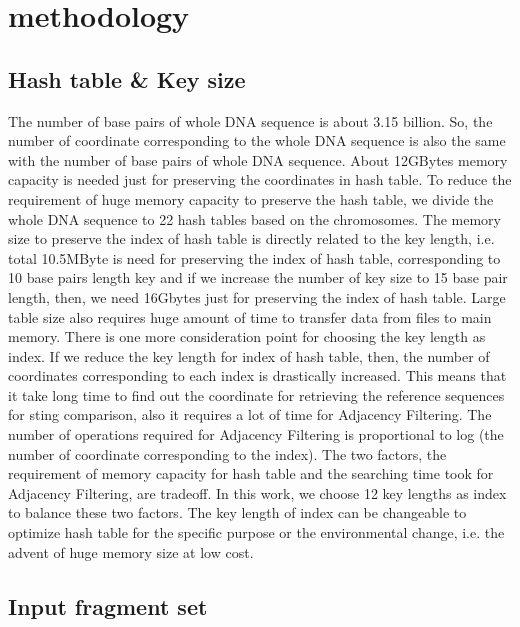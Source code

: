 \section{methodology} \label{sec:methodology}

\subsection{Hash table \& Key size} \label{sec:method_hash} 

The number of base pairs of whole DNA sequence is about 3.15 billion. So, the
number of coordinate corresponding to the whole DNA sequence is also the same
with the number of base pairs of whole DNA sequence. About 12GBytes memory
capacity is needed just for preserving the coordinates in hash table. To reduce
the requirement of huge memory capacity to preserve the hash table, we divide
the whole DNA sequence to 22 hash tables based on the chromosomes. The memory
size to preserve the index of hash table is directly related to the key length,
i.e. total 10.5MByte is need for preserving the index of hash table,
corresponding to 10 base pairs length key and if we increase the number of key
size to 15 base pair length, then, we need 16Gbytes just for preserving the
index of hash table. Large table size also requires huge amount of time to
transfer data from files to main memory. There is one more consideration point
for choosing the key length as index. If we reduce the key length for index of
hash table, then, the number of coordinates corresponding to each index is
drastically increased. This means that it take long time to find out the
coordinate for retrieving the reference sequences for sting comparison, also it
requires a lot of time for Adjacency Filtering. The number of operations
required for Adjacency Filtering is proportional to log (the number of
coordinate corresponding to the index).
The two factors, the requirement of memory capacity for hash table and the
searching time took for Adjacency Filtering, are tradeoff. In this work, we
choose 12 key lengths as index to balance these two factors. The key length of
index can be changeable to optimize hash table for the specific purpose or the
environmental change, i.e. the advent of huge memory size at low cost.\\

\subsection{Input fragment set} \label{sec:medhod_input}

